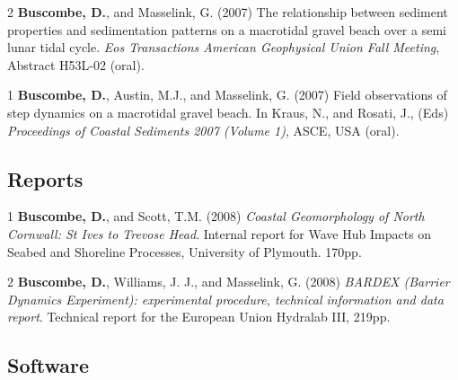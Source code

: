 \documentclass[margin,line]{resume}
\begin{document}
\begin{resume}
\begin{footnotesize}
	\begin{list1}
	\item[2] {\bf Buscombe, D.}, and Masselink, G. (2007) The relationship between sediment properties and sedimentation patterns on a macrotidal gravel beach over a semi lunar tidal cycle. {\sl Eos Transactions American Geophysical Union Fall Meeting}, Abstract H53L-02 (oral).\\
	
	\item[1] {\bf Buscombe, D.}, Austin, M.J., and Masselink, G. (2007) Field observations of step dynamics on a macrotidal gravel beach. In Kraus, N., and Rosati, J., (Eds) {\sl Proceedings of Coastal Sediments 2007 (Volume 1)}, ASCE, USA (oral).
	
	\end{list1}
	
	        \end{footnotesize}

	\subsection{\mysidestyle Reports}
        \begin{footnotesize}
	\begin{list1}
	 
	\item[1] {\bf Buscombe, D.}, and Scott, T.M. (2008) {\sl Coastal Geomorphology of North Cornwall: St Ives to Trevose Head}. Internal report for Wave Hub Impacts on Seabed and Shoreline Processes, University of Plymouth. 170pp.\\
	\item[2] {\bf Buscombe, D.}, Williams, J. J., and Masselink, G. (2008) {\sl BARDEX (Barrier Dynamics Experiment): experimental procedure, technical information and data report}. Technical report for the European Union Hydralab III, 219pp. 

	\end{list1}
        \end{footnotesize}

	\subsection{\mysidestyle Software}

        \begin{footnotesize}
	\begin{list1}
	 

\end{list1}
\end{footnotesize}
\end{resume}
\end{document}
